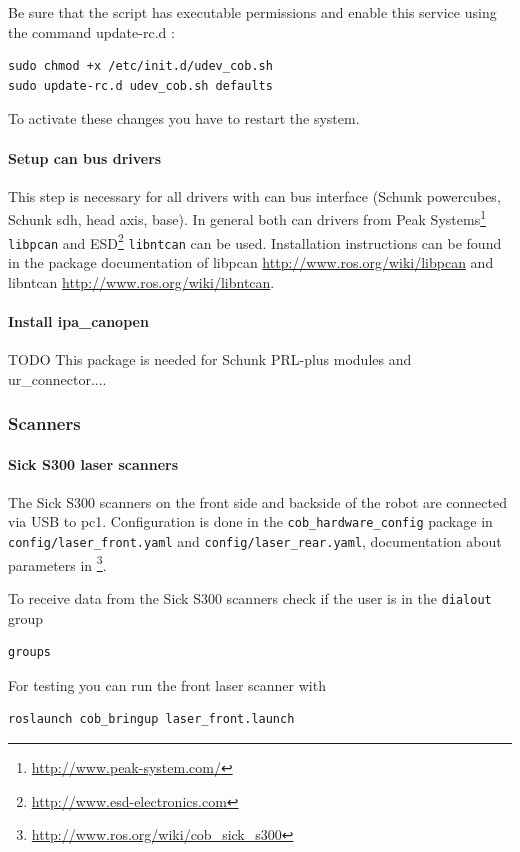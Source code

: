 Be sure that the script has executable permissions and enable this service  using  the command update-rc.d :
\begin{lstlisting}
sudo chmod +x /etc/init.d/udev_cob.sh
sudo update-rc.d udev_cob.sh defaults
\end{lstlisting}

To activate these changes you have to restart the system.

\paragraph{Setup can bus drivers}
This step is necessary for all drivers with can bus interface (Schunk powercubes, Schunk sdh, head axis, base). In general both can drivers from Peak Systems\footnote{\url{http://www.peak-system.com/}} \texttt{libpcan} and ESD\footnote{\url{http://www.esd-electronics.com}} \texttt{libntcan} can be used. Installation instructions can be found in the package documentation of libpcan \url{http://www.ros.org/wiki/libpcan} and libntcan \url{http://www.ros.org/wiki/libntcan}.

\paragraph{Install ipa\_canopen}\label{ipacanopen} TODO
This package is needed for Schunk PRL-plus modules and ur\_connector....

\subsubsection{Scanners}

\paragraph{Sick S300 laser scanners}
The Sick S300 scanners on the front side and backside of the robot are connected via USB to pc1. Configuration is done in the \texttt{cob\_hardware\_config} package in \texttt{config/laser\_front.yaml} and \texttt{config/laser\_rear.yaml}, documentation about parameters in \footnote{\url{http://www.ros.org/wiki/cob_sick_s300}}.

To receive data from the Sick S300 scanners check if the user is in the \texttt{dialout} group
\begin{lstlisting}
groups
\end{lstlisting}

For testing you can run the front laser scanner with
\begin{lstlisting}
roslaunch cob_bringup laser_front.launch
\end{lstlisting}

